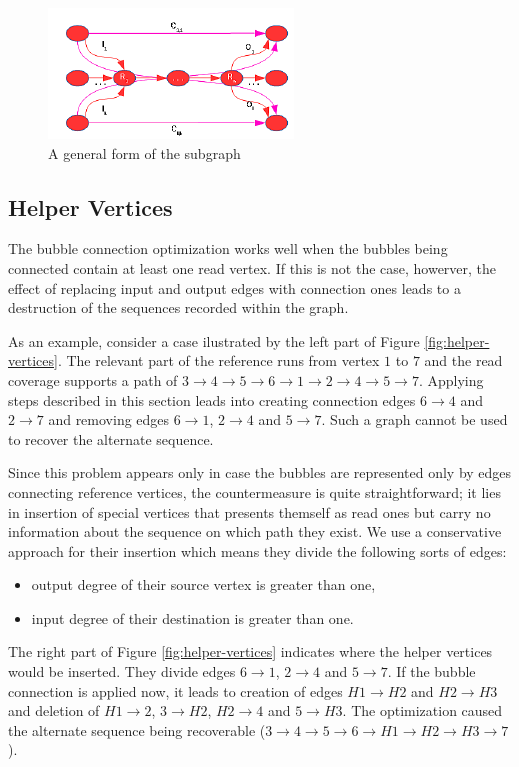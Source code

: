 \begin{figure}
	\centering
	\includegraphics{img/connection-abstract.pdf}
	\caption{A general form of the subgraph}
	\label{fig:connection-abstract}
\end{figure}

\subsection{Helper Vertices}
\label{subsec:helper-vertices}

The bubble connection optimization works well when the bubbles being connected contain at least one read vertex. If this is not the case, howerver, the effect of replacing input and output edges with connection ones leads to a destruction of the sequences recorded within the graph.

As an example, consider a case ilustrated by the left part of Figure \ref{fig:helper-vertices}. The relevant part of the reference runs from vertex $1$ to $7$ and the read coverage supports a path of $3 \to 4 \to 5 \to 6 \to 1 \to 2 \to 4 \to 5 \to 7$. Applying steps described in this section leads into creating connection edges $6 \to 4$ and $2 \to 7$ and removing edges $6 \to 1$, $2 \to 4$ and $5 \to 7$. Such a graph cannot be used to recover the alternate sequence.

Since this problem appears only in case the bubbles are represented only by edges connecting reference vertices, the countermeasure is quite straightforward; it lies in insertion of special vertices that presents themself as read ones but carry no information about the sequence on which path they exist. We use a conservative approach for their insertion which means they divide the following sorts of edges:
\begin{itemize}
\item output degree of their source vertex is greater than one,
\item input degree of their destination is greater than one.
\end{itemize}

The right part of Figure \ref{fig:helper-vertices} indicates where the helper vertices would be inserted. They divide edges $6 \to 1$, $2 \to 4$ and $5 \to 7$. If the bubble connection is applied now, it leads to creation of edges $H1 \to H2$ and $H2 \to H3$ and deletion of $H1 \to 2$, $3 \to H2$, $H2 \to 4$ and $5 \to H3$. The optimization caused the alternate sequence being recoverable ($3 \to 4 \to 5 \to 6 \to H1 \to H2 \to H3 \to 7$).


